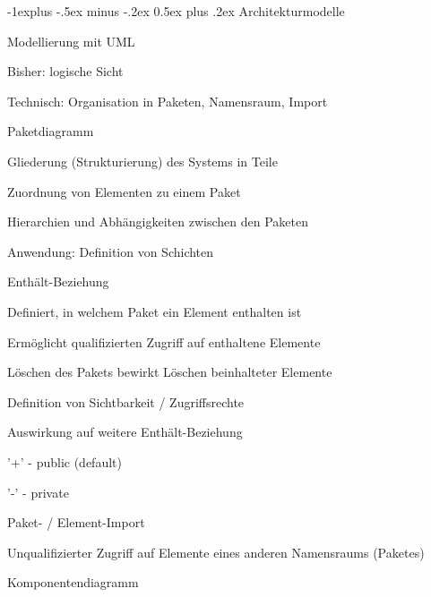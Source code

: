 \documentclass[a4paper]{article}
\makeatletter
\renewcommand{\subsection}{\@startsection{subsection}{2}{0mm}%
                                {-1explus -.5ex minus -.2ex}%
                                {0.5ex plus .2ex}%
                                {\normalfont\normalsize\bfseries}}
\makeatother
\begin{document}
\begin{multicols}{3}
  \subsection{Architekturmodelle}
  \begin{itemize*}
    \item Modellierung mit UML
    \begin{itemize*}
      \item Bisher: logische Sicht
      \item Technisch: Organisation in Paketen, Namensraum, Import
    \end{itemize*}
    \item Paketdiagramm
    \begin{itemize*}
      \item Gliederung (Strukturierung) des Systems in Teile
      \item Zuordnung von Elementen zu einem Paket
      \item Hierarchien und Abhängigkeiten zwischen den Paketen
      \item Anwendung: Definition von Schichten
    \end{itemize*}
    \item Enthält-Beziehung
    \begin{itemize*}
      \item Definiert, in welchem Paket ein Element enthalten ist
      \item Ermöglicht qualifizierten Zugriff auf enthaltene Elemente
      \item Löschen des Pakets bewirkt Löschen beinhalteter Elemente
      \item Definition von Sichtbarkeit / Zugriffsrechte
      \begin{itemize*}
        \item Auswirkung auf weitere Enthält-Beziehung
        \item '+' - public (default)
        \item '-' - private
      \end{itemize*}
    \end{itemize*}
    \item Paket- / Element-Import
    \begin{itemize*}
      \item Unqualifizierter Zugriff auf Elemente eines anderen Namensraums (Paketes)
    \end{itemize*}
    \item Komponentendiagramm
    \begin{itemize*}

\end{itemize*}
\end{itemize*}
\end{multicols}
\end{document}
